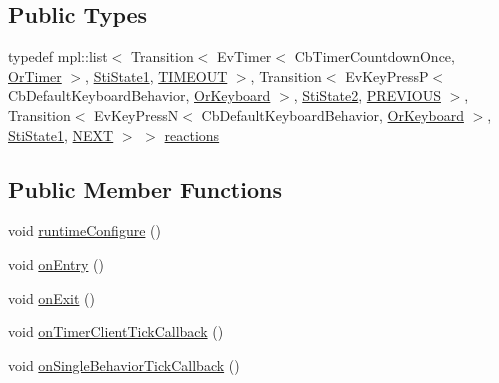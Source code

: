 \subsection*{Public Types}
\begin{DoxyCompactItemize}
\item 
typedef mpl\+::list$<$ Transition$<$ Ev\+Timer$<$ Cb\+Timer\+Countdown\+Once, \hyperlink{classsm__three__some_1_1OrTimer}{Or\+Timer} $>$, \hyperlink{structsm__three__some_1_1inner__states_1_1StiState1}{Sti\+State1}, \hyperlink{structsm__three__some_1_1inner__states_1_1StiState3_1_1TIMEOUT}{T\+I\+M\+E\+O\+UT} $>$, Transition$<$ Ev\+Key\+PressP$<$ Cb\+Default\+Keyboard\+Behavior, \hyperlink{classsm__three__some_1_1OrKeyboard}{Or\+Keyboard} $>$, \hyperlink{structsm__three__some_1_1inner__states_1_1StiState2}{Sti\+State2}, \hyperlink{structsm__three__some_1_1inner__states_1_1StiState3_1_1PREVIOUS}{P\+R\+E\+V\+I\+O\+US} $>$, Transition$<$ Ev\+Key\+PressN$<$ Cb\+Default\+Keyboard\+Behavior, \hyperlink{classsm__three__some_1_1OrKeyboard}{Or\+Keyboard} $>$, \hyperlink{structsm__three__some_1_1inner__states_1_1StiState1}{Sti\+State1}, \hyperlink{structsm__three__some_1_1inner__states_1_1StiState3_1_1NEXT}{N\+E\+XT} $>$ $>$ \hyperlink{structsm__three__some_1_1inner__states_1_1StiState3_a3c00d8e30a1a01b0783e9dfcf57bfd25}{reactions}
\end{DoxyCompactItemize}
\subsection*{Public Member Functions}
\begin{DoxyCompactItemize}
\item 
void \hyperlink{structsm__three__some_1_1inner__states_1_1StiState3_aec16c13bf440af18f898274110e97786}{runtime\+Configure} ()
\item 
void \hyperlink{structsm__three__some_1_1inner__states_1_1StiState3_a64fda2ad984526eef1039eb21296a939}{on\+Entry} ()
\item 
void \hyperlink{structsm__three__some_1_1inner__states_1_1StiState3_a52bd074c6e2ca2aeaded85f97ca593d4}{on\+Exit} ()
\item 
void \hyperlink{structsm__three__some_1_1inner__states_1_1StiState3_aa9e626e093269683522ed582db1c6bd6}{on\+Timer\+Client\+Tick\+Callback} ()
\item 
void \hyperlink{structsm__three__some_1_1inner__states_1_1StiState3_a1e26bb6a2e91c1b2a448bd29a50ecaaa}{on\+Single\+Behavior\+Tick\+Callback} ()
\end{DoxyCompactItemize}
